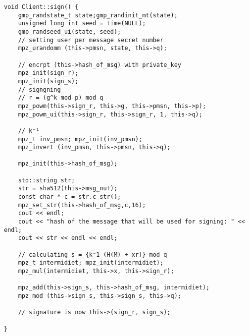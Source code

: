 \documentclass[12pt]{report}
\begin{document}
\begin{lstlisting}[caption=signing the message with DSS and sha512]
void Client::sign() {
	gmp_randstate_t state;gmp_randinit_mt(state);
	unsigned long int seed = time(NULL);
	gmp_randseed_ui(state, seed);
	// setting user per message secret number
	mpz_urandomm (this->pmsn, state, this->q);

	// encrpt (this->hash_of_msg) with private_key
	mpz_init(sign_r);
	mpz_init(sign_s);
	// signgning
	// r = (g^k mod p) mod q
	mpz_powm(this->sign_r, this->g, this->pmsn, this->p);
	mpz_powm_ui(this->sign_r, this->sign_r, 1, this->q);

	// k⁻¹
	mpz_t inv_pmsn; mpz_init(inv_pmsn);
	mpz_invert (inv_pmsn, this->pmsn, this->q);

	mpz_init(this->hash_of_msg);

	std::string str;
	str = sha512(this->msg_out);
	const char * c = str.c_str();
	mpz_set_str(this->hash_of_msg,c,16);
	cout << endl;
	cout << "hash of the message that will be used for signing: " << endl;
	cout << str << endl << endl;

	// calculating s = {k⁻1 (H(M) + xr)} mod q
	mpz_t intermidiet; mpz_init(intermidiet);
	mpz_mul(intermidiet, this->x, this->sign_r);

	mpz_add(this->sign_s, this->hash_of_msg, intermidiet);
	mpz_mod (this->sign_s, this->sign_s, this->q);

	// signature is now this->(sign_r, sign_s);

}
\end{lstlisting}
\end{document}
